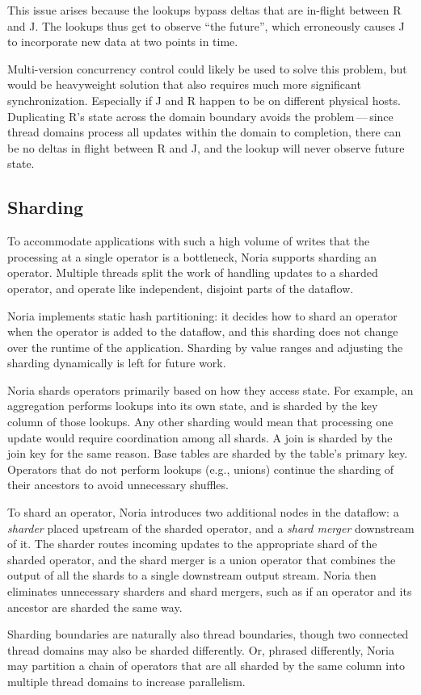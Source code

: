 This issue arises because the lookups bypass deltas that are in-flight between R
and J. The lookups thus get to observe ``the future'', which erroneously causes
J to incorporate new data at two points in time.

Multi-version concurrency control could likely be used to solve this problem,
but would be heavyweight solution that also requires much more significant
synchronization. Especially if J and R happen to be on different physical hosts.
Duplicating R's state across the domain boundary avoids the problem\,---\,since
thread domains process all updates within the domain to completion, there can be
no deltas in flight between R and J, and the lookup will never observe future
state.

\subsection{Sharding}
\label{s:noria:sharding}

To accommodate applications with such a high volume of writes that the
processing at a single operator is a bottleneck, Noria supports sharding an
operator. Multiple threads split the work of handling updates to a sharded
operator, and operate like independent, disjoint parts of the dataflow.

Noria implements static hash partitioning: it decides how to shard an operator
when the operator is added to the dataflow, and this sharding does not change
over the runtime of the application. Sharding by value ranges and adjusting the
sharding dynamically is left for future work.

Noria shards operators primarily based on how they access state. For example, an
aggregation performs lookups into its own state, and is sharded by the key
column of those lookups. Any other sharding would mean that processing one
update would require coordination among all shards. A join is sharded by the
join key for the same reason. Base tables are sharded by the table's primary
key. Operators that do not perform lookups (e.g., unions) continue the sharding
of their ancestors to avoid unnecessary shuffles.

To shard an operator, Noria introduces two additional nodes in the dataflow: a
\emph{sharder} placed upstream of the sharded operator, and a \emph{shard
merger} downstream of it. The sharder routes incoming updates to the appropriate
shard of the sharded operator, and the shard merger is a union operator that
combines the output of all the shards to a single downstream output stream.
Noria then eliminates unnecessary sharders and shard mergers, such as if an
operator and its ancestor are sharded the same way.

Sharding boundaries are naturally also thread boundaries, though two connected
thread domains may also be sharded differently. Or, phrased differently, Noria
may partition a chain of operators that are all sharded by the same column into
multiple thread domains to increase parallelism.

